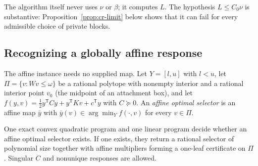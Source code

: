 The algorithm itself never uses $\nu$ or $\beta$; it computes $L$. The
hypothesis $L\le C_0\nu$ is substantive: Proposition~\ref{prop:cr-limit} below
shows that it can fail for every admissible choice of private blocks.

\subsection{Recognizing a globally affine response}

The affine instance needs no supplied map. Let $Y=[l,u]$ with $l<u$, let
$\Pi=\{v:Wv\le\omega\}$ be a rational polytope with nonempty interior and a
rational interior point $v_0$ (the midpoint of an attachment box), and let
$f(y,v)=\frac12y^{\mathsf T}Cy+y^{\mathsf T}Kv+c^{\mathsf T}y$ with $C\succeq0$.
An \emph{affine optimal selector} is an affine map $\bar y$ with
$\bar y(v)\in\arg\min_{Y}f(\cdot,v)$ for every $v\in\Pi$.

\begin{theorem}\label{thm:cr-recog}
One exact convex quadratic program and one linear program decide whether an
affine optimal selector exists. If one exists, they return a rational selector
of polynomial size together with affine multipliers forming a one-leaf
certificate on $\Pi$. Singular $C$ and nonunique responses are allowed.
\end{theorem}


